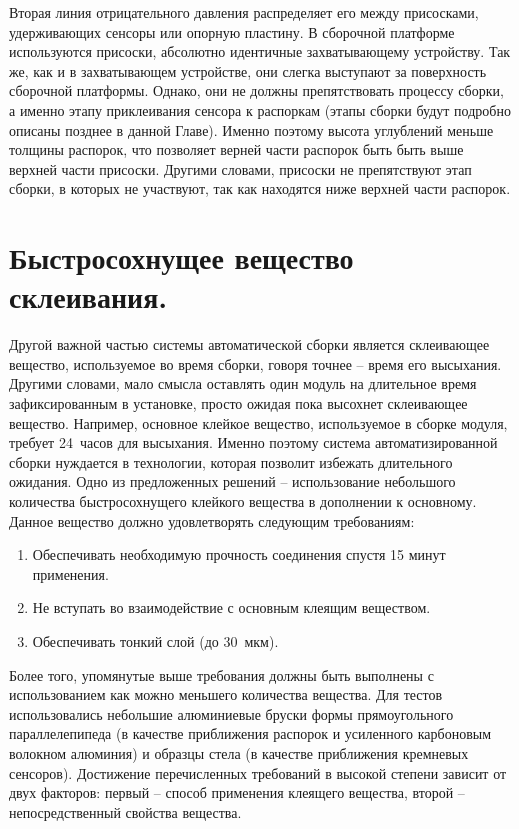 Вторая линия отрицательного давления распределяет его между присосками, удерживающих сенсоры или опорную пластину. В сборочной платформе используются присоски, абсолютно идентичные захватывающему устройству. Так же, как и в захватывающем устройстве, они слегка выступают за поверхность сборочной платформы. Однако, они не должны препятствовать процессу сборки, а именно этапу приклеивания сенсора к распоркам (этапы сборки будут подробно описаны позднее в данной Главе). Именно поэтому высота углублений меньше толщины распорок, что позволяет верней части распорок быть быть выше верхней части присоски. Другими словами, присоски не препятствуют этап сборки, в которых не участвуют, так как находятся ниже верхней части распорок.

\section{Быстросохнущее вещество склеивания.}

Другой важной частью системы автоматической сборки является склеивающее вещество, используемое во время сборки, говоря точнее -- время его высыхания. Другими словами, мало смысла оставлять один модуль на длительное время зафиксированным в установке, просто ожидая пока высохнет склеивающее вещество. Например, основное клейкое вещество, используемое в сборке модуля, требует 24~часов для высыхания. Именно поэтому система автоматизированной сборки нуждается в технологии, которая позволит избежать длительного ожидания. Одно из предложенных решений -- использование небольшого количества быстросохнущего клейкого вещества в дополнении к основному. Данное вещество должно удовлетворять следующим требованиям:

\begin{enumerate}
\setlength\itemsep{-0.5em}
\item Обеспечивать необходимую прочность соединения спустя 15 минут применения.
\item Не вступать во взаимодействие с основным клеящим веществом.
\item Обеспечивать тонкий слой (до 30~мкм).
\end{enumerate}

Более того, упомянутые выше требования должны быть выполнены с использованием как можно меньшего количества вещества. Для тестов использовались небольшие алюминиевые бруски формы прямоугольного параллелепипеда (в качестве приближения распорок и усиленного карбоновым волокном алюминия) и образцы стела (в качестве приближения кремневых сенсоров). Достижение перечисленных требований в высокой степени зависит от двух факторов: первый -- способ применения клеящего вещества, второй -- непосредственный свойства вещества.

